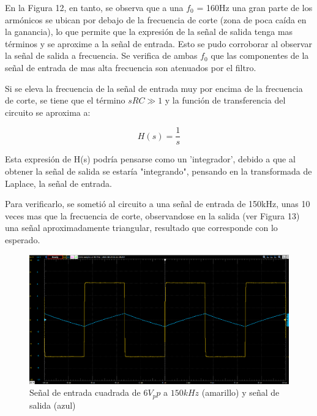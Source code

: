 En la Figura 12, en tanto, se observa que a una $f_0$ = 160Hz una gran parte de los armónicos se ubican por debajo de la frecuencia de corte (zona de poca caída en la ganancia), lo que permite que la expresión de la señal de salida tenga mas términos y se aproxime a la señal de entrada. Esto se pudo corroborar al observar la señal de salida a frecuencia. Se verifica de ambas $f_0$ que las componentes de la señal de entrada de mas alta frecuencia son atenuados por el filtro.


Si se eleva la frecuencia de la señal de entrada muy por encima de la frecuencia de corte, se tiene que el término $sRC\gg 1$ y la función de transferencia del circuito se aproxima a:

$$H(s)= \frac{1}{s}$$

Esta expresión de H(s) podría pensarse como un 'integrador', debido a que al obtener la señal de salida se estaría "integrando", pensando en la transformada de Laplace, la señal de entrada.

Para verificarlo, se sometió al circuito a una señal de entrada de 150kHz, unas 10 veces mas que la frecuencia de corte, observandose en la salida (ver Figura 13) una señal aproximadamente triangular, resultado que corresponde con lo esperado. 

\begin{figure}[H]
	\centering
	\includegraphics[scale=0.5]{../Informe/Imagenes/Ej2Scope150kHz (2).png}
	\caption{Señal de entrada cuadrada de $6V_pp$ a $150kHz$ (amarillo) y señal de salida (azul)}
	\label{ej1cir}
\end{figure}
